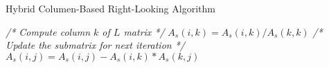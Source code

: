 \documentclass{article}
\begin{document}
\begin{algorithm}
    \caption{Hybrid Columen-Based Right-Looking Algorithm} 
    \label{alg1}
    \begin{algorithmic}[1]
            \State \emph{/* Compute column $k$ of $L$ matrix */}
                \State $A_{s}(i, k)=A_{s}(i, k) / A_{s}(k, k)$
            \EndFor
            \State \emph{/* Update the submatrix for next iteration */}
                    \State $A_{s}(i, j)=A_{s}(i, j)-A_{s}(i, k) * A_{s}(k, j)$
                \EndFor
            \EndFor
        \EndFor
    \end{algorithmic}
\end{algorithm}
\end{document}
